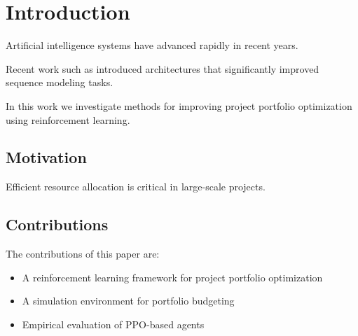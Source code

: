 \section{Introduction}

Artificial intelligence systems have advanced rapidly in recent years.

Recent work such as \cite{vaswani2017attention} introduced architectures
that significantly improved sequence modeling tasks.

In this work we investigate methods for improving project portfolio
optimization using reinforcement learning.

\subsection{Motivation}

Efficient resource allocation is critical in large-scale projects.

\subsection{Contributions}

The contributions of this paper are:

\begin{itemize}
\item A reinforcement learning framework for project portfolio optimization
\item A simulation environment for portfolio budgeting
\item Empirical evaluation of PPO-based agents
\end{itemize}
